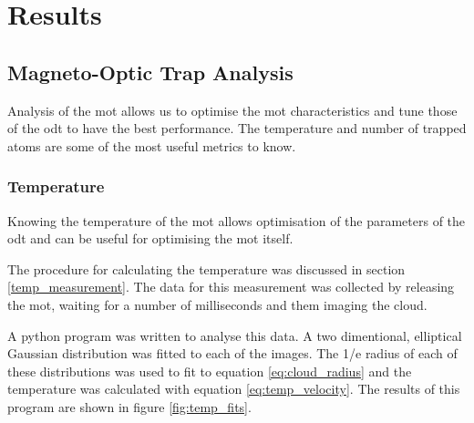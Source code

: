\chapter{Results}

\section{Magneto-Optic Trap Analysis}
Analysis of the \gls{mot} allows us to optimise the \gls{mot} characteristics and tune those of the \gls{odt} to have the best performance. The temperature and number of trapped atoms are some of the most useful metrics to know.

\subsection{Temperature}
Knowing the temperature of the \gls{mot} allows optimisation of the parameters of the \gls{odt} and can be useful for optimising the \gls{mot} itself.

The procedure for calculating the temperature was discussed in section \ref{temp_measurement}. The data for this measurement was collected by releasing the \gls{mot}, waiting for a number of milliseconds and them imaging the cloud.

A python program was written to analyse this data. A two dimentional, elliptical Gaussian distribution was fitted to each of the images. The 1/e radius of each of these distributions was used to fit to equation \ref{eq:cloud_radius} and the temperature was calculated with equation \ref{eq:temp_velocity}. The results of this program are shown in figure \ref{fig:temp_fits}.

